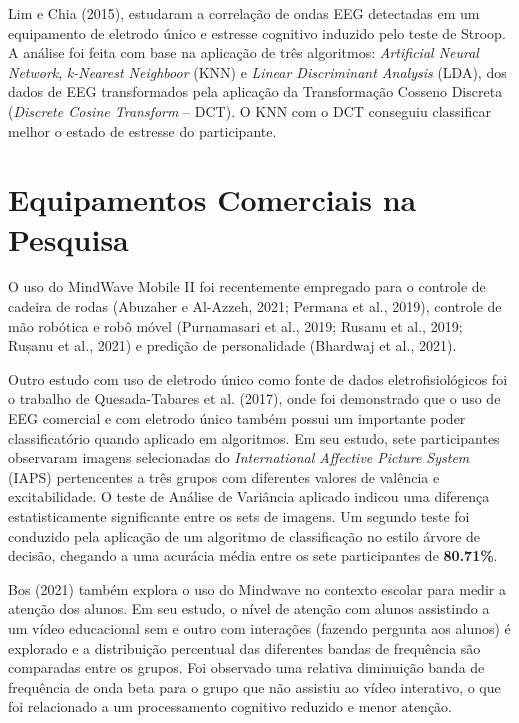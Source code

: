Lim e Chia (2015), estudaram a correlação de ondas EEG detectadas em um equipamento de eletrodo único e 
estresse cognitivo induzido pelo teste de Stroop. A análise foi feita com base na aplicação de três algoritmos: 
\textit{Artificial Neural Network}, \textit{k-Nearest Neighboor} (KNN) e \textit{Linear Discriminant Analysis} (LDA), 
dos dados de EEG transformados pela aplicação da Transformação Cosseno Discreta (\textit{Discrete Cosine Transform} – DCT). 
O KNN com o DCT conseguiu classificar melhor o estado de estresse do participante.

\section{Equipamentos Comerciais na Pesquisa}

O uso do MindWave Mobile II foi recentemente empregado para o 
controle de cadeira de rodas (Abuzaher e Al-Azzeh, 2021; Permana et al., 2019), 
controle de mão robótica e robô móvel (Purnamasari et al., 2019; Rusanu et al., 2019; Rușanu et al., 2021) 
e predição de personalidade (Bhardwaj et al., 2021). 

Outro estudo com uso de eletrodo único como fonte de dados eletrofisiológicos foi o trabalho de Quesada-Tabares et al. (2017), 
onde foi demonstrado que o uso de EEG comercial e com eletrodo único também possui um importante poder classificatório 
quando aplicado em algoritmos. Em seu estudo, sete participantes observaram imagens selecionadas do 
\textit{International Affective Picture System} (IAPS) pertencentes a três grupos com diferentes valores de 
valência e excitabilidade. O teste de Análise de Variância aplicado indicou 
uma diferença estatisticamente significante entre os sets de imagens.
 Um segundo teste foi conduzido pela aplicação de um algoritmo de classificação no estilo árvore de decisão,
  chegando a uma acurácia média entre os sete participantes de \textbf{80.71\%}.

Bos (2021) também explora o uso do Mindwave no contexto escolar para medir a atenção dos alunos. Em seu estudo, 
o nível de atenção com alunos assistindo a um vídeo educacional sem e outro com interações (fazendo pergunta aos alunos)
 é explorado e a distribuição percentual das diferentes bandas de frequência são comparadas entre os grupos. Foi 
 observado uma relativa diminuição banda de frequência de onda beta para o grupo que não assistiu ao vídeo interativo, 
 o que foi relacionado a um processamento cognitivo reduzido e menor atenção.

